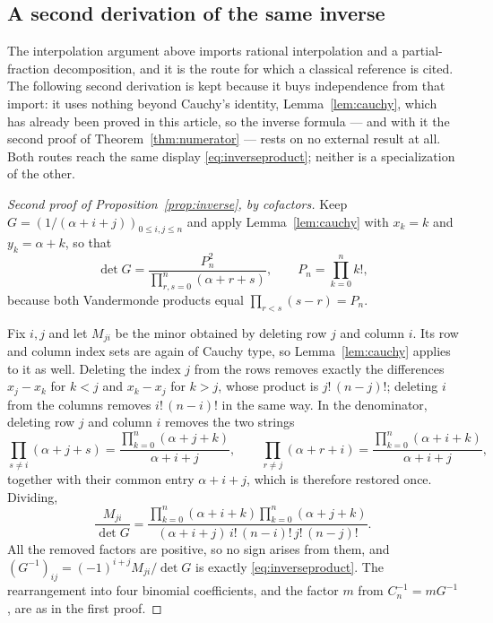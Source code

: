 \documentclass[11pt,a4paper]{article}
\numberwithin{equation}{section}
\theoremstyle{definition}
\theoremstyle{remark}
\begin{document}
\subsection{A second derivation of the same inverse}\label{sec:cofactor}
The interpolation argument above imports rational interpolation and a partial-fraction decomposition, and it is the route for which a classical reference is cited. The following second derivation is kept because it buys independence from that import: it uses nothing beyond Cauchy's identity, Lemma~\ref{lem:cauchy}, which has already been proved in this article, so the inverse formula --- and with it the second proof of Theorem~\ref{thm:numerator} --- rests on no external result at all. Both routes reach the same display \eqref{eq:inverseproduct}; neither is a specialization of the other.

\begin{proof}[Second proof of Proposition~\ref{prop:inverse}, by cofactors]
Keep $G=(1/(\alpha+i+j))_{0\leq i,j\leq n}$ and apply Lemma~\ref{lem:cauchy} with
$x_k=k$ and $y_k=\alpha+k$, so that
\[
 \det G=\frac{P_n^2}{\displaystyle\prod_{r,s=0}^n(\alpha+r+s)},
 \qquad P_n=\prod_{k=0}^nk!,
\]
because both Vandermonde products equal $\prod_{r<s}(s-r)=P_n$.

Fix $i,j$ and let $M_{ji}$ be the minor obtained by deleting row $j$ and column $i$. Its row and column index sets are again of Cauchy type, so Lemma~\ref{lem:cauchy} applies to it as well. Deleting the index $j$ from the rows removes exactly the differences $x_j-x_k$ for $k<j$ and $x_k-x_j$ for $k>j$, whose product is $j!\,(n-j)!$; deleting $i$ from the columns removes $i!\,(n-i)!$ in the same way. In the denominator, deleting row $j$ and column $i$ removes the two strings
\[
 \prod_{s\neq i}(\alpha+j+s)=\frac{\prod_{k=0}^n(\alpha+j+k)}{\alpha+i+j},
 \qquad
 \prod_{r\neq j}(\alpha+r+i)=\frac{\prod_{k=0}^n(\alpha+i+k)}{\alpha+i+j},
\]
together with their common entry $\alpha+i+j$, which is therefore restored once. Dividing,
\[
 \frac{M_{ji}}{\det G}
 =\frac{\prod_{k=0}^n(\alpha+i+k)\prod_{k=0}^n(\alpha+j+k)}
 {(\alpha+i+j)\,i!\,(n-i)!\,j!\,(n-j)!}.
\]
All the removed factors are positive, so no sign arises from them, and
$(G^{-1})_{ij}=(-1)^{i+j}M_{ji}/\det G$ is exactly \eqref{eq:inverseproduct}. The rearrangement into four binomial coefficients, and the factor $m$ from $C_n^{-1}=mG^{-1}$, are as in the first proof.
\end{proof}
\end{document}
